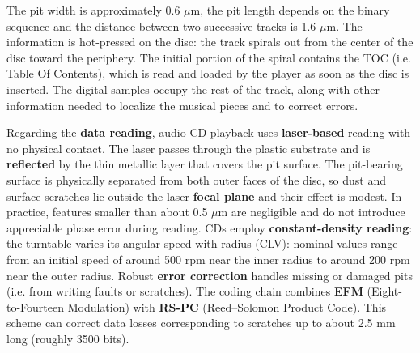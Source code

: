 The pit width is approximately 0.6 $\mu$m, the pit length depends on the binary sequence and the distance between two successive tracks is 1.6 $\mu$m.
The information is hot-pressed on the disc: the track spirals out from the center of the disc toward the periphery.
The initial portion of the spiral contains the TOC (i.e. Table Of Contents), which is read and loaded by the player as soon as the disc is inserted.
The digital samples occupy the rest of the track, along with other information needed to localize the musical pieces and to correct errors.

Regarding the \textbf{data reading}, audio CD playback uses \textbf{laser-based} reading with no physical contact.
The laser passes through the plastic substrate and is \textbf{reflected} by the thin metallic layer that covers the pit surface.
The pit-bearing surface is physically separated from both outer faces of the disc, so dust and surface scratches lie outside the laser \textbf{focal plane} and their effect is modest.
In practice, features smaller than about 0.5 $\mu$m are negligible and do not introduce appreciable phase error during reading.
CDs employ \textbf{constant-density reading}: the turntable varies its angular speed with radius (CLV): nominal values range from an initial speed of around 500 rpm near the inner radius to around 200 rpm near the outer radius.
Robust \textbf{error correction} handles missing or damaged pits (i.e. from writing faults or scratches).
The coding chain combines \textbf{EFM} (Eight-to-Fourteen Modulation) with \textbf{RS-PC} (Reed–Solomon Product Code).
This scheme can correct data losses corresponding to scratches up to about 2.5 mm long (roughly 3500 bits).


\clearpage
